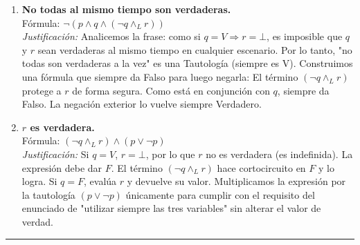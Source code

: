 \begin{enumerate}[label=\textbf{\alph*)}]
    \vspace{0.4cm}
    \item \textbf{No todas al mismo tiempo son verdaderas.} \\
    Fórmula: $\neg (p \wedge q \wedge (\neg q \wedge_L r))$ \\
    \textit{Justificación:} Analicemos la frase: como si $q=V \Rightarrow r=\bot$, es imposible que $q$ y $r$ sean verdaderas al mismo tiempo en cualquier escenario. Por lo tanto, "no todas son verdaderas a la vez" es una Tautología (siempre es V). Construimos una fórmula que siempre da Falso para luego negarla: El término $(\neg q \wedge_L r)$ protege a $r$ de forma segura. Como está en conjunción con $q$, siempre da Falso. La negación exterior lo vuelve siempre Verdadero.

    \vspace{0.4cm}
    \item \textbf{$r$ es verdadera.} \\
    Fórmula: $(\neg q \wedge_L r) \wedge (p \vee \neg p)$ \\
    \textit{Justificación:} Si $q=V$, $r=\bot$, por lo que $r$ no es verdadera (es indefinida). La expresión debe dar $F$. El término $(\neg q \wedge_L r)$ hace cortocircuito en $F$ y lo logra. Si $q=F$, evalúa $r$ y devuelve su valor. Multiplicamos la expresión por la tautología $(p \vee \neg p)$ únicamente para cumplir con el requisito del enunciado de "utilizar siempre las tres variables" sin alterar el valor de verdad.

\end{enumerate}

\vspace{0.5cm}
\hrule
\vspace{0.5cm}